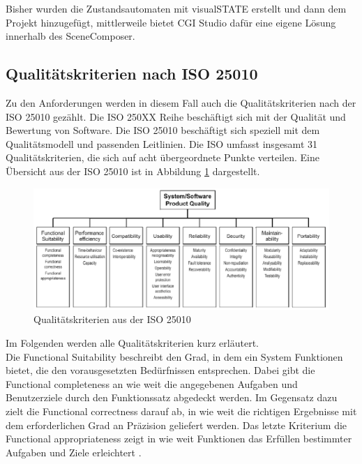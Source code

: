 Bisher wurden die Zustandsautomaten mit visualSTATE erstellt und dann dem Projekt hinzugefügt, mittlerweile bietet CGI Studio dafür eine eigene Lösung innerhalb des SceneComposer.\\
 

\subsection{Qualitätskriterien nach ISO 25010}\label{qualitaet}

Zu den Anforderungen werden in diesem Fall auch die Qualitätskriterien nach der ISO 25010 gezählt. Die ISO 250XX Reihe beschäftigt sich mit der Qualität und Bewertung von Software. Die ISO 25010 beschäftigt sich speziell mit dem Qualitätsmodell und passenden Leitlinien. Die ISO umfasst insgesamt 31 Qualitätskriterien, die sich auf acht übergeordnete Punkte verteilen. Eine Übersicht aus der ISO 25010 ist in Abbildung \ref{fig:Kriterien} dargestellt.\\

\begin{figure}[htb]
	\centering
	\includegraphics[width=\textwidth]{img/3_entwicklung_neues_kontept/Qualitaetskriterien}
	\caption[Qualitätskriterien aus der ISO 25010]{Qualitätskriterien aus der ISO 25010 \cite{iso25010}}
	\label{fig:Kriterien}
\end{figure}

Im Folgenden werden alle Qualitätskriterien kurz erläutert. \\

Die Functional Suitability beschreibt den Grad, in dem ein System Funktionen bietet, die den vorausgesetzten Bedürfnissen entsprechen. Dabei gibt die Functional completeness an wie weit die angegebenen Aufgaben und Benutzerziele durch den Funktionssatz abgedeckt werden. Im Gegensatz dazu zielt die Functional correctness darauf ab, in wie weit die richtigen Ergebnisse mit dem erforderlichen Grad an Präzision geliefert werden. Das letzte Kriterium die Functional appropriateness zeigt in wie weit Funktionen das Erfüllen bestimmter Aufgaben und Ziele erleichtert \cite{iso25010}.\\

